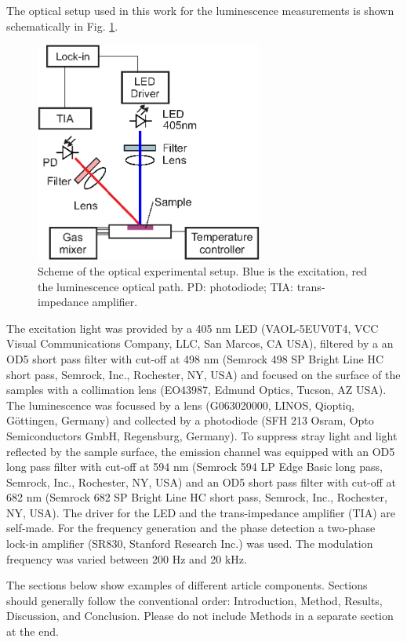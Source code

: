 \documentclass[9pt,twocolumn,twoside]{optica}
\begin{document}
The optical setup used in this work for the luminescence measurements is shown schematically in Fig. \ref{fig:setup}.
\begin{figure}[t]
\centering
\includegraphics[keepaspectratio, width=7.5cm]{Figures/setup}
\caption{Scheme of the optical experimental setup. Blue is the excitation, red the luminescence optical path. PD: photodiode; TIA: trans-impedance amplifier.}
\label{fig:setup}
\end{figure}
The excitation light was provided by a 405 nm LED (VAOL-5EUV0T4, VCC Visual Communications Company, LLC, San Marcos, CA USA), filtered by a an OD5 short pass filter with cut-off at 498 nm (Semrock 498 SP Bright Line HC short pass, Semrock, Inc., Rochester, NY, USA) and focused on the surface of the samples with a collimation lens (EO43987, Edmund Optics, Tucson, AZ USA). The luminescence was focussed by a lens (G063020000, LINOS, Qioptiq, Göttingen, Germany) and collected by a photodiode (SFH 213 Osram, Opto Semiconductors GmbH,  Regensburg, Germany).
To suppress stray light and light reflected by the sample surface, the emission channel was equipped with an OD5 long pass filter with cut-off at 594 nm (Semrock 594 LP Edge Basic long pass, Semrock, Inc., Rochester, NY, USA) and an OD5 short pass filter with cut-off at 682 nm (Semrock 682 SP Bright Line HC short pass, Semrock, Inc., Rochester, NY, USA). The driver for the LED and the trans-impedance amplifier (TIA) are self-made.
For the frequency generation and the phase detection a two-phase lock-in amplifier (SR830, Stanford Research Inc.) was used. The modulation frequency was varied between 200 Hz and 20 kHz.



The sections below show examples of different article components. Sections should generally follow the conventional order: Introduction, Method, Results, Discussion, and Conclusion.  Please do not include Methods in a separate section at the end.
\end{document}
